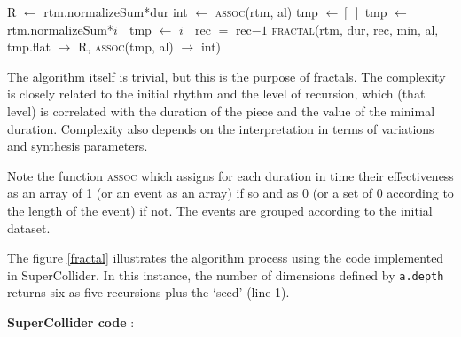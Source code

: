 \documentclass{article}
\begin{document}
\bigskip\bigskip

\begin{algorithmic}%
\State
{} R $\gets$ rtm.normalizeSum*dur \EndIf
{} int $\gets$ \textsc{assoc}(rtm, al) \EndIf
\State tmp $\gets [\:]$ 
\State 
{} 
\State tmp $\gets$ rtm.normalizeSum*$i$
\Else $\;$ tmp $\gets$ $i$
\EndIf
\EndFor
\State
{} 
\State \Return [R, int]
\Else  $\;$  
 rec $=$ rec$-1$ \EndIf
\State \textsc{fractal}(rtm, dur, rec, min, al, 
        \newline \hspace*{5em} tmp.flat $\to$ R, 
        \newline \hspace*{5em} \textsc{assoc}(tmp, al) $\to$ int)
\EndIf
\EndProcedure
\State
{}
\end{algorithmic}

\bigskip

The algorithm itself is trivial, but this is the purpose of fractals. The complexity is closely related to the initial rhythm and the level of recursion, which (that level) is correlated with the duration of the piece and the value of the minimal duration. Complexity also depends on the interpretation in terms of variations and synthesis parameters.

Note the function \textsc{assoc} which assigns for each duration in time their effectiveness as an array of 1 (or an event as an array) if so and as 0 (or a set of 0 according to the length of the event) if not. The events are grouped according to the initial dataset.

The figure \ref{fractal} illustrates the algorithm process using the code implemented in SuperCollider. In this instance, the number of dimensions defined by \texttt{a.depth} returns six as five recursions plus the `seed' (line 1). 

\bigskip
\noindent \textbf{SuperCollider code} : 
\end{document}
